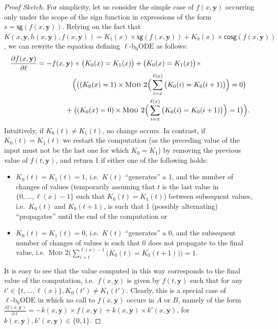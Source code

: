 \documentclass[11pt, oneside]{article}
\newcommand{\fun}[1]{\mathsf{#1}}
\newcommand{\tu}[1]{\mathbf{#1}}
\theoremstyle{definition}
\newcommand{\schODE}{\ell\text{-b}_0\text{ODE}}
\begin{document}
\begin{proof}[Proof Sketch]
    For simplicity, let us consider the simple case of $f(x, \tu y)$ occurring only under the scope of the sign function in expressions of the form $s=\fun{sg}(f(x, \tu y))$.
    Relying on the fact that $K(x, \tu y, h(x, \tu y), f(x, \tu y))= K_1(x) \times \fun{sg}(f(x, \tu y)) + K_0(x) \times \fun{cosg}(f(x, \tu y))$, we can rewrite the equation defining $\schODE$ as follows: 
  \begin{align*} 
        \frac{\partial f(x,\tu y)}{\partial \ell} &= - f(x,\tu y)\times \big(K_0(x) =K_1(x)\big) +
        \big(K_0(x)=K_1(x)\big)\times \\
        & \quad \quad \quad \quad \quad \Big(\big((K_0(x)=1) \times \textsc{Mod 2} \Big(\sum^{\ell(x)}_{i=x}\big(K_0(i)=K_0(i+1)\big)\Big)=0\big) \\
        & \quad \quad \quad \quad + \big((K_0(x)=0) \times \textsc{Mod 2} \Big(\sum^{\ell(x)}_{i=x}\big(K_0(i)=K_0(i+1)\big)\Big)=1\big)\Big).
    \end{align*}
    \normalsize
    Intuitively, if $K_0(t)\neq K_1(t)$, no change occurs.
    In contrast, if $K_0(t)=K_1(t)$ we restart the computation (as the preceding value of the input must not be the last one for which $K_0=K_1$) by removing the previous value of $f(t,\tu y)$, and return 1 if either one of the following holds:
    \begin{itemize}
        \itemsep0em
        \item[i] $K_0(t)=K_1(t)=1$, i.e.~$K(t)$  ``generates'' a 1, and the number of changes of values (temporarily assuming that $t$ is the last value in $\{0,\dots, \ell(x)-1\}$ such that $K_0(t)=K_1(t)$) between subsequent values, i.e.~$K_0(t)$ and $K_0(t+1)$, is such that 1 (possibly alternating)  ``propagates'' until the end of the computation or 
        \item[ii] $K_0(t)=K_1(t)=0$, i.e.~$K(t)$  ``generates'' a 0, and the subsequent number of changes of values is such that 0 does not propagate to the final value, i.e.~\textsc{Mod 2}\Big($\sum^{\ell(x)-1}_{i=t}\big(K_0(t)=K_0(t+1)\big)\Big)=1$.
    \end{itemize}
    It is easy to see that the value computed in this way corresponds to the final value of the computation, i.e.~$f(x,\tu y)$ is given by $f(t, \tu y)$ such that for any $t'\in \{t,\dots, \ell(x)\}, K_0(t')\neq K_1(t')$.
    Clearly, this is a special case of $\schODE$ in which no call to $f(x,\tu y)$ occurs in $A$ or $B$, namely of the form $\frac{\partial f(x,\tu y)}{\partial \ell}=-k(x, \tu y) \times f(x,\tu y) + k(x, \tu y) \times k'(x,\tu y)$, for $k(x, \tu y),k'(x, \tu y)\in \{0,1\}$.

\end{proof}
\end{document}
